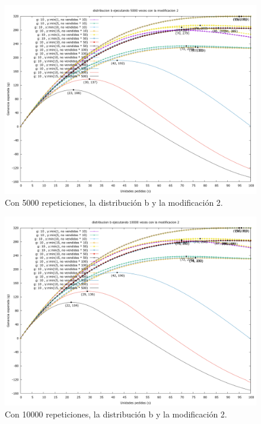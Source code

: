 \documentclass[12pt, spanish]{article}
\begin{document}
\begin{figure}[H]
	\centering
	\includegraphics[scale = 0.3]{prob_b/datos_b_5000_2.png}
	\caption{Con 5000 repeticiones, la distribución b y la modificación 2.}
	\label{fig:ej1_a_5000}

\end{figure}


\begin{figure}[H]
	\centering
	\includegraphics[scale = 0.3]{prob_b/datos_b_10000_2.png}
	\caption{Con 10000 repeticiones, la distribución b y la modificación 2.}
	\label{fig:ej1_a_10000}

\end{figure}
\end{document}
